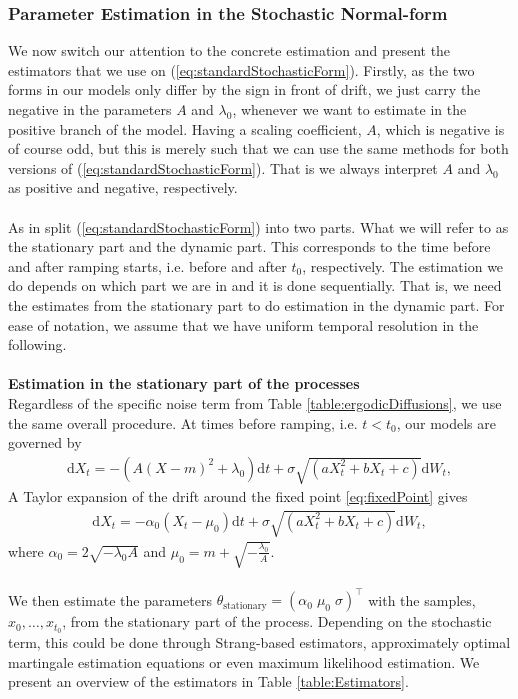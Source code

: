 \subsubsection{Parameter Estimation in the Stochastic Normal-form}
We now switch our attention to the concrete estimation and present the estimators that we use on (\ref{eq:standardStochasticForm}). Firstly, as the two forms in our models only differ by the sign in front of drift, we just carry the negative in the parameters $A$ and $\lambda_0$, whenever we want to estimate in the positive branch of the model. Having a scaling coefficient, $A$, which is negative is of course odd, but this is merely such that we can use the same methods for both versions of (\ref{eq:standardStochasticForm}). That is we always interpret $A$ and $\lambda_0$ as positive and negative, respectively.\\\\
As in \cite{Ditlevsen2023} split (\ref{eq:standardStochasticForm}) into two parts. What we will refer to as the stationary part and the dynamic part. This corresponds to the time before and after ramping starts, i.e. before and after $t_0$, respectively. The estimation we do depends on which part we are in and it is done sequentially. That is, we need the estimates from the stationary part to do estimation in the dynamic part. For ease of notation, we assume that we have uniform temporal resolution in the following. \\\\
\textbf{Estimation in the stationary part of the processes}\\
Regardless of the specific noise term from Table \ref{table:ergodicDiffusions}, we use the same overall procedure. At times before ramping, i.e. $t < t_0$, our models are governed by
\begin{align}
    \mathrm{d}X_t = -\left(A(X - m)^2 + \lambda_0\right)\mathrm{d}t + \sigma\sqrt{\left(aX_t^2 + bX_t + c\right)}\mathrm{d}W_t, 
\end{align}
A Taylor expansion of the drift around the fixed point \ref{eq:fixedPoint} gives
\begin{align}
    \mathrm{d}X_t = -\alpha_0\left(X_t - \mu_0\right)\mathrm{d}t + \sigma\sqrt{\left(aX_t^2 + bX_t + c\right)}\mathrm{d}W_t, \label{eq:TaylorStationary}
\end{align}
where $\alpha_0 = 2\sqrt{-\lambda_0 A}$ and $\mu_0 = m + \sqrt{-\frac{\lambda_0}{A}}$.\\\\
We then estimate the parameters $\theta_{\mathrm{stationary}} = (\alpha_0\; \mu_0\; \sigma)^\top$ with the samples, $x_{0}, \dots, x_{t_0}$, from the stationary part of the process. Depending on the stochastic term, this could be done through Strang-based estimators, approximately optimal martingale estimation equations or even maximum likelihood estimation. We present an overview of the estimators in Table \ref{table:Estimators}.\\\\
